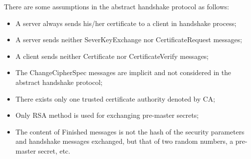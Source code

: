 \documentclass[a4paper,fleqn]{cas-dc}
\begin{document}


There are some assumptions in the abstract handshake protocol as follows:
\begin{itemize}
\item A server always sends his/her certificate to a client in handshake process; 
\item A server sends neither SeverKeyExchange nor CertificateRequest messages; 
\item A client sends neither Certificate nor CertificateVerify messages; \item The ChangeCipherSpec messages are implicit and not considered in the abstract handshake protocol; 
\item There exists only one trusted certificate authority denoted by CA; 
\item Only RSA method is used for exchanging pre-master secrets; 
\item The content of Finished messages is not the hash of the security parameters and handshake messages exchanged, but that of
two random numbers, a pre-master secret, etc.
\end{itemize}
\end{document}
